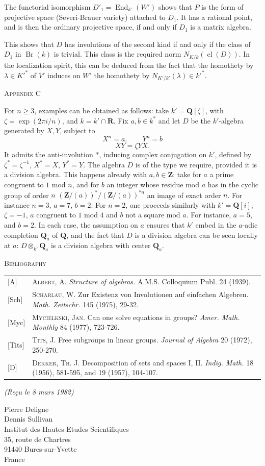 \documentclass[10pt,a4paper]{article}
\DeclareMathOperator{\End}{End}
\DeclareMathOperator{\Br}{Br}
\DeclareMathOperator{\cl}{cl}
\newcommand{\AppendixHeading}[1]{\par\vspace{1.2em}\begin{center}\textsc{Appendix #1}\end{center}\vspace{0.6em}\par}
\newcommand{\BibliographyHeading}{\par\vspace{1.2em}\begin{center}\textsc{Bibliography}\end{center}\vspace{0.6em}\par}
\begin{document}
The functorial isomorphism $D'_1=\End_{k'}(W')$ shows that $P$ is the form of
projective space (Severi-Brauer variety) attached to $D_1$. It has a rational point,
and is then the ordinary projective space, if and only if $D_1$ is a matrix algebra.

\newpage
This shows that $D$ has involutions of the second kind if and only if the class
of $D_1$ in $\Br(k)$ is trivial. This class is the required norm $N_{K/k}(\cl(D))$. In the
localization spirit, this can be deduced from the fact that the homothety by
$\lambda\in K'^*$ of $V'$ induces on $W'$ the homothety by $N_{K'/k'}(\lambda)\in k'^*$.

\AppendixHeading{C}
For $n\geq3$, examples can be obtained as follows: take $k'=\mathbf{Q}[\zeta]$, with
$\zeta=\exp(2\pi i/n)$, and $k=k'\cap\mathbf{R}$. Fix $a,b\in k^*$ and let $D$ be the $k'$-algebra
generated by $X,Y$, subject to
\[
X^n=a,\qquad Y^n=b
\]
\[
XY=\zeta YX.
\]
It admits the anti-involution $*$, inducing complex conjugation on $k'$, defined
by $\zeta^*=\zeta^{-1}$, $X^*=X$, $Y^*=Y$. The algebra $D$ is of the type we require,
provided it is a division algebra. This happens already with $a,b\in\mathbf{Z}$: take
for $a$ a prime congruent to $1$ mod $n$, and for $b$ an integer whose residue mod $a$
has in the cyclic group of order $n$ $(\mathbf{Z}/(a))^*/(\mathbf{Z}/(a))^{*n}$ an image of exact order $n$.
For instance $n=3$, $a=7$, $b=2$. For $n=2$, one proceeds similarly with
$k'=\mathbf{Q}[i]$, $\zeta=-1$, $a$ congruent to $1$ mod $4$ and $b$ not a square mod $a$. For
instance, $a=5$, and $b=2$. In each case, the assumption on $a$ ensures that $k'$
embed in the $a$-adic completion $\mathbf{Q}_a$ of $\mathbf{Q}$, and the fact that $D$ is a division
algebra can be seen locally at $a$: $D\otimes_{k'}\mathbf{Q}_a$ is a division algebra with center $\mathbf{Q}_a$.

\newpage
\BibliographyHeading
\noindent
\begin{tabular}{@{}p{11mm}p{}@{}}
{[A]} & \textsc{Albert, A.} \textit{Structure of algebras.} A.M.S. Colloquium Publ. 24 (1939). \\[0.35em]
{[Sch]} & \textsc{Scharlau, W.} Zur Existenz von Involutionen auf einfachen Algebren. \textit{Math. Zeitschr.} 145 (1975), 29-32. \\[0.35em]
{[Myc]} & \textsc{Mycielkski, Jan.} Can one solve equations in groups? \textit{Amer. Math. Monthly} 84 (1977), 723-726. \\[0.35em]
{[Tits]} & \textsc{Tits, J.} Free subgroups in linear groups. \textit{Journal of Algebra} 20 (1972), 250-270. \\[0.35em]
{[D]} & \textsc{Dekker, Th. J.} Decomposition of sets and spaces I, II. \textit{Indig. Math.} 18 (1956), 581-595, and 19 (1957), 104-107.
\end{tabular}

\vspace{1.3em}
\hfill\textit{(Reçu le 8 mars 1982)}

\vspace{2.1em}
\noindent
Pierre Deligne\\
Dennis Sullivan\\[0.55em]
\hspace*{1.8em}Institut des Hautes Etudes Scientifiques\\
\hspace*{1.8em}35, route de Chartres\\
\hspace*{1.8em}91440 Bures-sur-Yvette\\
\hspace*{1.8em}France
\end{document}
